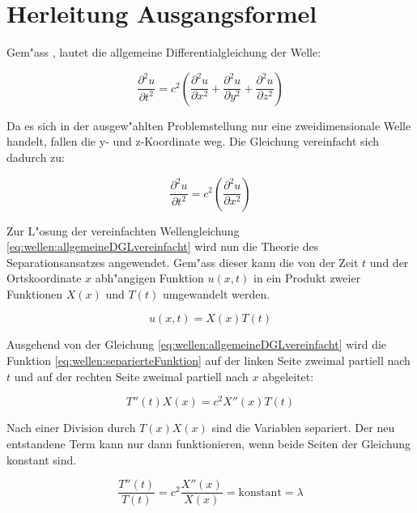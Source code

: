 \section{Herleitung Ausgangsformel}
Gem"ass \cite{wellen:smirnow2}, lautet die allgemeine Differentialgleichung der 
Welle:

\begin{equation*}
	\frac{\partial^2 u}{\partial t^2}
	=
	c^2
	\left(
		\frac{\partial^2 u}{\partial x^2} 
		+ \frac{\partial^2 u}{\partial y^2} 
		+ \frac{\partial^2 u}{\partial z^2}
	\right)
	\label{eq:wellen:allgemeineDGL}
\end{equation*}

Da es sich in der ausgew"ahlten Problemstellung nur eine zweidimensionale Welle 
handelt, fallen die y- und z-Koordinate weg. Die Gleichung vereinfacht sich 
dadurch zu:

\begin{equation}
	\frac{\partial^2 u}{\partial t^2}
	=
	c^2
	\left(
		\frac{\partial^2 u}{\partial x^2} 
	\right)
	\label{eq:wellen:allgemeineDGLvereinfacht}
\end{equation}

Zur L"osung der vereinfachten Wellengleichung 
\ref{eq:wellen:allgemeineDGLvereinfacht} wird nun die Theorie des 
Separationsansatzes angewendet. Gem"ass dieser kann die von der Zeit $t$ und 
der Ortskoordinate $x$ abh"angigen Funktion $u(x,t)$ in ein Produkt 
zweier Funktionen $X(x)$ und $T(t)$ umgewandelt werden.

\begin{equation}
	u (x,t) = X(x) T(t)
	\label{eq:wellen:separierteFunktion}
\end{equation}

Ausgehend von der Gleichung \ref{eq:wellen:allgemeineDGLvereinfacht} wird die 
Funktion \ref{eq:wellen:separierteFunktion} auf der linken Seite zweimal 
partiell nach $t$ und auf der rechten Seite zweimal partiell nach $x$ 
abgeleitet:

\begin{equation*}
	T''(t) X(x) = c^2 X''(x)T(t)
\end{equation*}

Nach einer Division durch $T(x)X(x)$ sind die Variablen separiert. Der neu 
entstandene Term kann nur dann funktionieren, wenn beide Seiten der Gleichung 
konstant sind.

\begin{equation*}
	\frac{T''(t)}{T(t)}
	=
	c^2 \frac{X''(x)}{X(x)} = \text{konstant} = \lambda
\end{equation*}

